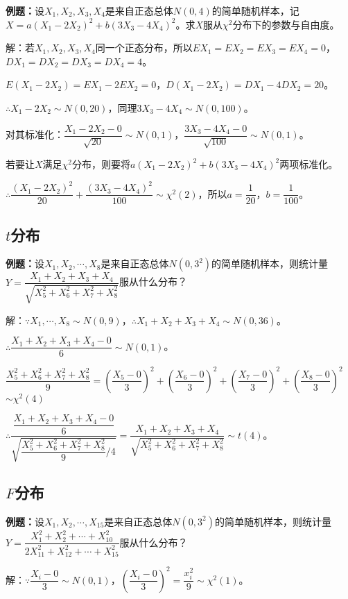 \documentclass[UTF8, 12pt]{ctexart}
\begin{document}
\textbf{例题：}设$X_1,X_2,X_3,X_4$是来自正态总体$N(0,4)$的简单随机样本，记$X=a(X_1-2X_2)^2+b(3X_3-4X_4)^2$。求$X$服从$\chi^2$分布下的参数与自由度。

解：若$X_1,X_2,X_3,X_4$同一个正态分布，所以$EX_1=EX_2=EX_3=EX_4=0$，$DX_1=DX_2=DX_3=DX_4=4$。

$E(X_1-2X_2)=EX_1-2EX_2=0$，$D(X_1-2X_2)=DX_1-4DX_2=20$。

$\therefore X_1-2X_2\sim N(0,20)$，同理$3X_3-4X_4\sim N(0,100)$。

对其标准化：$\dfrac{X_1-2X_2-0}{\sqrt{20}}\sim N(0,1)$，$\dfrac{3X_3-4X_4-0}{\sqrt{100}}\sim N(0,1)$。

若要让$X$满足$\chi^2$分布，则要将$a(X_1-2X_2)^2+b(3X_3-4X_4)^2$两项标准化。

$\therefore\dfrac{(X_1-2X_2)^2}{20}+\dfrac{(3X_3-4X_4)^2}{100}\sim\chi^2(2)$，所以$a=\dfrac{1}{20}$，$b=\dfrac{1}{100}$。

\subsection{\texorpdfstring{$t$分布}{}}

\textbf{例题：}设$X_1,X_2,\cdots,X_8$是来自正态总体$N(0,3^2)$的简单随机样本，则统计量$Y=\dfrac{X_1+X_2+X_3+X_4}{\sqrt{X_5^2+X_6^2+X_7^2+X_8^2}}$服从什么分布？

解：$\because X_1,\cdots,X_8\sim N(0,9)$，$\therefore X_1+X_2+X_3+X_4\sim N(0,36)$。

$\therefore\dfrac{X_1+X_2+X_3+X_4-0}{6}\sim N(0,1)$。

$\dfrac{X_5^2+X_6^2+X_7^2+X_8^2}{9}=\left(\dfrac{X_5-0}{3}\right)^2+\left(\dfrac{X_6-0}{3}\right)^2+\left(\dfrac{X_7-0}{3}\right)^2+\left(\dfrac{X_8-0}{3}\right)^2$\\$\sim\chi^2(4)$

$\therefore\dfrac{\dfrac{X_1+X_2+X_3+X_4-0}{6}}{\sqrt{\dfrac{X_5^2+X_6^2+X_7^2+X_8^2}{9}/4}}=\dfrac{X_1+X_2+X_3+X_4}{\sqrt{X_5^2+X_6^2+X_7^2+X_8^2}}\sim t(4)$。

\subsection{\texorpdfstring{$F$分布}{}}

\textbf{例题：}设$X_1,X_2,\cdots,X_15$是来自正态总体$N(0,3^2)$的简单随机样本，则统计量$Y=\dfrac{X_1^2+X_2^2+\cdots+X_{10}^2}{2X_{11}^2+X_{12}^2+\cdots+X_{15}^2}$服从什么分布？

解：$\because\dfrac{X_i-0}{3}\sim N(0,1)$，$\left(\dfrac{X_i-0}{3}\right)^2=\dfrac{x_i^2}{9}\sim\chi^2(1)$。
\end{document}
